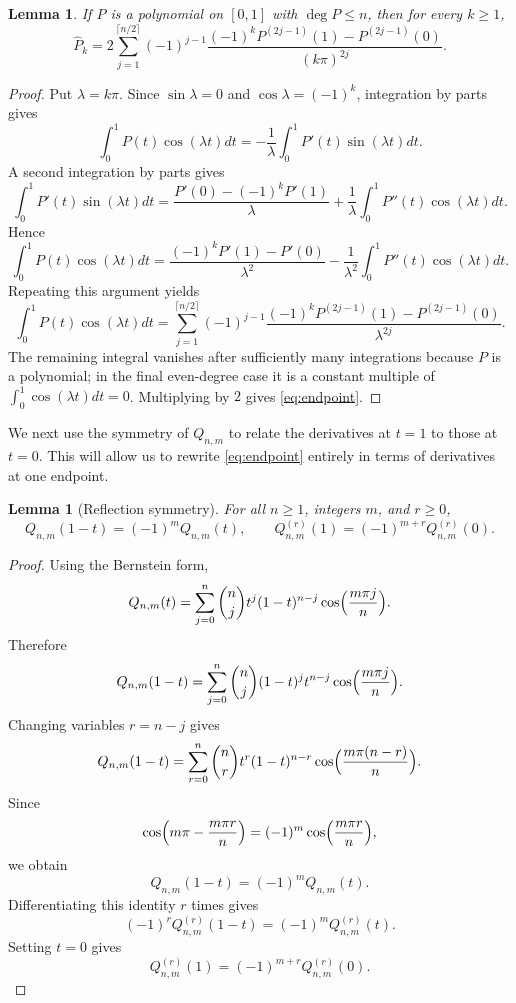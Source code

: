 \documentclass[a4paper,12pt]{amsart}
\newtheorem{lemma}[theorem]{Lemma}
\theoremstyle{definition}
\theoremstyle{remark}
\begin{document}
\begin{lemma}\label{lem:endpoint}
If $P$ is a polynomial on $[0,1]$ with $\deg P\le n$, then for every $k\ge1$,
\begin{equation}
\label{eq:endpoint}
\widehat P_k
=2\sum_{j=1}^{\lceil n/2\rceil}(-1)^{j-1}
\frac{(-1)^kP^{(2j-1)}(1)-P^{(2j-1)}(0)}{(k\pi)^{2j}}.
\end{equation}
\end{lemma}

\begin{proof}
Put $\lambda=k\pi$. Since $\sin\lambda=0$ and $\cos\lambda=(-1)^k$, integration by parts gives
\[ 
\int_0^1 P(t)\cos(\lambda t) dt 
= -\frac1\lambda\int_0^1 P'(t)\sin(\lambda t) dt. 
\]
A second integration by parts gives
\[ 
\int_0^1 P'(t) \sin(\lambda t) dt = \frac{P'(0)-(-1)^kP'(1)}{\lambda} + \frac1\lambda\int_0^1 P''(t)\cos(\lambda t) dt. 
\]
Hence 
\[ 
\int_0^1 P(t)\cos(\lambda t) dt = \frac{(-1)^kP'(1)-P'(0)}{\lambda^2} -\frac1{\lambda^2}\int_0^1 P''(t)\cos(\lambda t) dt. 
\]
Repeating this argument yields
\[ 
\int_0^1 P(t)\cos(\lambda t) dt = \sum_{j=1}^{\lceil n/2\rceil}(-1)^{j-1} \frac{(-1)^kP^{(2j-1)}(1)-P^{(2j-1)}(0)}{\lambda^{2j}}. 
\]
The remaining integral vanishes after sufficiently many integrations because $P$ is a polynomial; in the final even-degree case it is a constant multiple of $\int_0^1 \cos(\lambda t) dt = 0$. Multiplying by $2$ gives \eqref{eq:endpoint}.
\end{proof}



We next use the symmetry of $Q_{n,m}$ to relate the derivatives at $t=1$ to those at $t=0$. This will allow us to rewrite \eqref{eq:endpoint} entirely in terms of derivatives at one endpoint.

\begin{lemma}[Reflection symmetry]\label{lem:reflect}
For all $n\ge1$, integers $m$, and $r\ge0$,
\[
Q_{n,m}(1-t)=(-1)^mQ_{n,m}(t),
\qquad
Q_{n,m}^{(r)}(1)=(-1)^{m+r}Q_{n,m}^{(r)}(0).
\]
\end{lemma}


\begin{proof}
Using the Bernstein form,
\[ 
Q_{n,m}(t) = \sum_{j=0}^n {n\choose j}t^j(1-t)^{n-j} \cos\Bigl(\frac{m\pi j}{n}\Bigr). 
\]
Therefore
\[ 
Q_{n,m}(1-t) = \sum_{j=0}^n {n\choose j}(1-t)^jt^{n-j} \cos\Bigl(\frac{m\pi j}{n}\Bigr). 
\]
Changing variables $r=n-j$ gives
\[ 
Q_{n,m}(1-t) = \sum_{r=0}^n {n\choose r}t^r(1-t)^{n-r} \cos\Bigl(\frac{m\pi(n-r)}{n}\Bigr). 
\]
Since 
\[ 
\cos\Bigl(m\pi-\frac{m\pi r}{n}\Bigr) = (-1)^m\cos\Bigl(\frac{m\pi r}{n}\Bigr), 
\]
we obtain
\[ 
Q_{n,m}(1-t)=(-1)^mQ_{n,m}(t). 
\]
Differentiating this identity $r$ times gives
\[ 
(-1)^r Q_{n,m}^{(r)}(1-t) = (-1)^mQ_{n,m}^{(r)}(t). 
\]
Setting $t=0$ gives 
\[ 
Q_{n,m}^{(r)}(1)=(-1)^{m+r} Q_{n,m}^{(r)}(0). 
\]
\end{proof}
\end{document}
